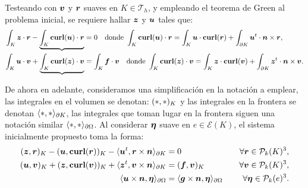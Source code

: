 \documentclass{article}
\begin{document}
\noindent Testeando con $\boldsymbol{v}$ y $\boldsymbol{r}$ suaves en $K \in \mathcal{T}_h$, y empleando el teorema de Green al problema inicial, se requiere hallar $\boldsymbol{z}$ y $\boldsymbol{u}$ tales que:
\begin{align*}
    \int_K \boldsymbol{z} \cdot \boldsymbol{r} - \underbrace{\int_K \textbf{\textup{curl}}(\boldsymbol{u}) \cdot \boldsymbol{r}} &= 0 \quad \text{donde}~ \int_K \textbf{\textup{curl}}(\boldsymbol{u}) \cdot \boldsymbol{r} = \int_K \boldsymbol{u} \cdot \textbf{\textup{curl}}(\boldsymbol{r}) + \int_{\partial K} \boldsymbol{u}^t \cdot \boldsymbol{n} \times \boldsymbol{r}, \\
    \int_K \boldsymbol{u} \cdot \boldsymbol{v} + \underbrace{\int_K \textbf{\textup{curl}}(\boldsymbol{z}) \cdot \boldsymbol{v}} &= \int_K \boldsymbol{f} \cdot \boldsymbol{v} \quad \text{donde}~ \int_K \textbf{\textup{curl}}(\boldsymbol{z}) \cdot \boldsymbol{v} = \int_K \boldsymbol{z} \cdot \textbf{\textup{curl}}(\boldsymbol{v}) + \int_{\partial K} \boldsymbol{z}^t \cdot \boldsymbol{n} \times \boldsymbol{v}.
\end{align*}

\noindent De ahora en adelante, consideramos una simplificación en la notación a emplear, las integrales en el volumen se denotan: $(*, *)_K$ y las integrales en la frontera se denotan $\langle *, * \rangle_{\partial K}$, las integrales que toman lugar en la frontera siguen una notación similar $\langle *, * \rangle_{\partial \Omega}$. Al considerar $\boldsymbol{\eta}$ suave en $e \in \mathcal{E}(K)$, el sistema inicialmente propuesto toma la forma:
\begin{align*}
    (\boldsymbol{z}, \boldsymbol{r})_K - (\boldsymbol{u}, \textbf{\textup{curl}}(\boldsymbol{r}))_K - \langle \boldsymbol{u}^t, \boldsymbol{r} \times \boldsymbol{n} \rangle_{\partial K} &= 0 &\quad \forall \boldsymbol{r} \in \mathcal{P}_k(K)^3, \\
    (\boldsymbol{u}, \boldsymbol{v})_K + (\boldsymbol{z}, \textbf{\textup{curl}}(\boldsymbol{v}))_K + \langle \boldsymbol{z}^t, \boldsymbol{v} \times \boldsymbol{n} \rangle_{\partial K} &= (\boldsymbol{f}, \boldsymbol{v})_K &\quad \forall \boldsymbol{v} \in \mathcal{P}_k(K)^3, \\
    \langle \boldsymbol{u} \times \boldsymbol{n}, \boldsymbol{\eta} \rangle_{\partial \Omega} &= \langle \boldsymbol{g} \times \boldsymbol{n}, \boldsymbol{\eta} \rangle_{\partial \Omega} &\quad \forall \boldsymbol{\eta} \in \mathcal{P}_k(e)^3.
\end{align*}
\end{document}
